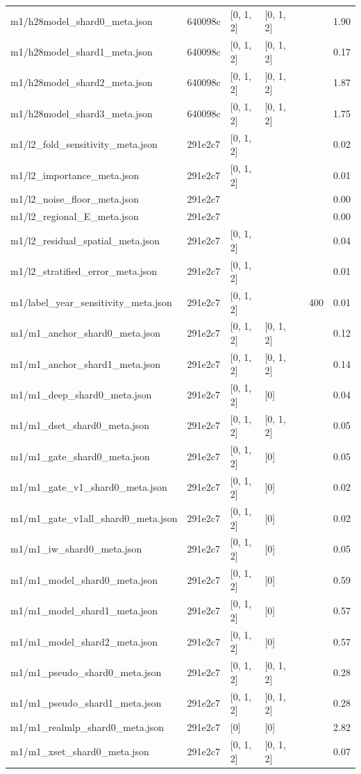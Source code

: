 \begin{longtable}{llllrrr}
m1/h28model\_shard0\_meta.json & 640098c & [0, 1, 2] & [0, 1, 2] &  &  & 1.90 \\
m1/h28model\_shard1\_meta.json & 640098c & [0, 1, 2] & [0, 1, 2] &  &  & 0.17 \\
m1/h28model\_shard2\_meta.json & 640098c & [0, 1, 2] & [0, 1, 2] &  &  & 1.87 \\
m1/h28model\_shard3\_meta.json & 640098c & [0, 1, 2] & [0, 1, 2] &  &  & 1.75 \\
m1/l2\_fold\_sensitivity\_meta.json & 291e2c7 & [0, 1, 2] &  &  &  & 0.02 \\
m1/l2\_importance\_meta.json & 291e2c7 & [0, 1, 2] &  &  &  & 0.01 \\
m1/l2\_noise\_floor\_meta.json & 291e2c7 &  &  &  &  & 0.00 \\
m1/l2\_regional\_E\_meta.json & 291e2c7 &  &  &  &  & 0.00 \\
m1/l2\_residual\_spatial\_meta.json & 291e2c7 & [0, 1, 2] &  &  &  & 0.04 \\
m1/l2\_stratified\_error\_meta.json & 291e2c7 & [0, 1, 2] &  &  &  & 0.01 \\
m1/label\_year\_sensitivity\_meta.json & 291e2c7 & [0, 1, 2] &  &  & 400 & 0.01 \\
m1/m1\_anchor\_shard0\_meta.json & 291e2c7 & [0, 1, 2] & [0, 1, 2] &  &  & 0.12 \\
m1/m1\_anchor\_shard1\_meta.json & 291e2c7 & [0, 1, 2] & [0, 1, 2] &  &  & 0.14 \\
m1/m1\_deep\_shard0\_meta.json & 291e2c7 & [0, 1, 2] & [0] &  &  & 0.04 \\
m1/m1\_dset\_shard0\_meta.json & 291e2c7 & [0, 1, 2] & [0, 1, 2] &  &  & 0.05 \\
m1/m1\_gate\_shard0\_meta.json & 291e2c7 & [0, 1, 2] & [0] &  &  & 0.05 \\
m1/m1\_gate\_v1\_shard0\_meta.json & 291e2c7 & [0, 1, 2] & [0] &  &  & 0.02 \\
m1/m1\_gate\_v1all\_shard0\_meta.json & 291e2c7 & [0, 1, 2] & [0] &  &  & 0.02 \\
m1/m1\_iw\_shard0\_meta.json & 291e2c7 & [0, 1, 2] & [0] &  &  & 0.05 \\
m1/m1\_model\_shard0\_meta.json & 291e2c7 & [0, 1, 2] & [0] &  &  & 0.59 \\
m1/m1\_model\_shard1\_meta.json & 291e2c7 & [0, 1, 2] & [0] &  &  & 0.57 \\
m1/m1\_model\_shard2\_meta.json & 291e2c7 & [0, 1, 2] & [0] &  &  & 0.57 \\
m1/m1\_pseudo\_shard0\_meta.json & 291e2c7 & [0, 1, 2] & [0, 1, 2] &  &  & 0.28 \\
m1/m1\_pseudo\_shard1\_meta.json & 291e2c7 & [0, 1, 2] & [0, 1, 2] &  &  & 0.28 \\
m1/m1\_realmlp\_shard0\_meta.json & 291e2c7 & [0] & [0] &  &  & 2.82 \\
m1/m1\_xset\_shard0\_meta.json & 291e2c7 & [0, 1, 2] & [0, 1, 2] &  &  & 0.07 \\
\bottomrule
\end{longtable}
